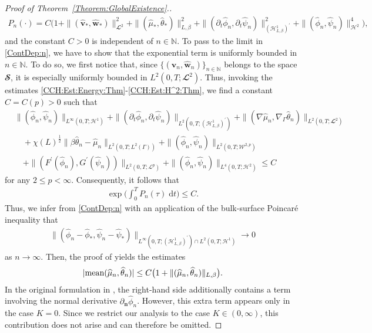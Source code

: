 \documentclass[10pt,reqno]{amsart}
\theoremstyle{remark}
\numberwithin{equation}{section}
\newcommand{\abs}[1]{| #1 |}
\newcommand{\norm}[1]{\| #1 \|}
\newcommand{\scp}[2]{ ( #1 , #2  )}
\newcommand{\mean}[2]{\textnormal{mean}\scp{#1}{#2}}
\newcommand{\N}{\mathbb N}
\newcommand{\n}{\mathbf{n}}
\newcommand{\bv}{\mathbf{v}}
\newcommand{\bw}{\mathbf{w}}
\newcommand{\ww}{\widehat{\bw}}
\newcommand{\wv}{\widehat{\bv}}
\newcommand{\wphi}{\widehat{\phi}}
\newcommand{\wpsi}{\widehat{\psi}}
\newcommand{\wmu}{\widehat{\mu}}
\newcommand{\wtheta}{\widehat{\theta}}
\newcommand{\dt}{\;\mathrm dt}
\newcommand{\delt}{\partial_{t}}
\newcommand{\deln}{\partial_\n}
\newcommand{\Grad}{\nabla}
\newcommand{\Gradg}{\nabla_\Ga}
\newcommand{\Ga}{\Gamma}
\begin{document}
\begin{proof}[Proof of Theorem~\ref{Theorem:GlobalExistence}.]
\begin{align*}
    P_n(\cdot) = C\big(1 + \norm{(\wv_\ast,\ww_\ast)}_{\mathbfcal{L}^2}^2 + \norm{(\wmu_\ast,\wtheta_\ast)}_{L,\beta}^2 + \norm{(\delt\wphi_n,\delt\wpsi_n)}_{(\mathcal{H}^1_{L,\beta})^\prime}^2 + \norm{(\wphi_n,\wpsi_n)}_{\mathcal{H}^2}^4\big),
\end{align*}
and the constant $C > 0$ is independent of $n\in\N$. To pass to the limit in \eqref{ContDep:n}, we have to show that the exponential term is uniformly bounded in $n\in\N$. To do so, we first notice that, since $\{(\wv_n,\ww_n)\}_{n\in\N}$ belongs to the space $\mathbfcal{S}$, it is especially uniformly bounded in $L^2(0,T;\mathbfcal{L}^2)$. Thus, invoking the estimates \eqref{CCH:Est:Energy:Thm}-\eqref{CCH:Est:H^2:Thm}, we find a constant $C = C(p) > 0$ such that
\begin{align}\label{Est:All:n}
    &\norm{(\wphi_n,\wpsi_n)}_{L^\infty(0,T;\mathcal{H}^1)} + \norm{(\delt\wphi_n,\delt\wpsi_n)}_{L^2(0,T;(\mathcal{H}^1_{L,\beta})^\prime)} + \norm{(\Grad\wmu_n,\Gradg\wtheta_n)}_{L^2(0,T;\mathbfcal{L}^2)} \nonumber \\
    &\quad + \chi(L)^{\frac12}\norm{\beta\wtheta_n - \wmu_n}_{L^2(0,T;L^2(\Ga))} + \norm{(\wphi_n,\wpsi_n)}_{L^2(0,T;\mathcal{W}^{2,p})} \\
    &\quad + \norm{(F^\prime(\wphi_n),G^\prime(\wpsi_n))}_{L^2(0,T;\mathcal{L}^p)} + \norm{(\wphi_n,\wpsi_n)}_{L^4(0,T;\mathcal{H}^2)} \leq C \nonumber
\end{align}
for any $2 \leq p < \infty$. Consequently, it follows that
\begin{align*}
    \exp\Big(\int_0^T P_n(\tau)\dt\Big) \leq C.
\end{align*}
Thus, we infer from \eqref{ContDep:n} with an application of the bulk-surface Poincar\'{e} inequality that
\begin{align}\label{ContDep:Conv}
    \norm{(\wphi_n - \wphi_\ast, \wpsi_n - \wpsi_\ast)}_{L^\infty(0,T;(\mathcal{H}^1_{L,\beta})^\prime)\cap L^2(0,T;\mathcal{H}^1)} \rightarrow 0 
\end{align}
as $n\rightarrow\infty$. 
Then, the proof of \cite[Theorem~3.4]{Knopf2025} yields the estimates
\begin{align}\label{Est:mt:mean:n}
    \abs{\mean{\wmu_n}{\wtheta_n}} \leq C\big(1 + \norm{(\wmu_n,\wtheta_n)}_{L,\beta}\big).
\end{align}
In the original formulation in \cite{Knopf2025}, the right-hand side additionally contains a term involving the normal derivative $\deln\wphi_n$. However, this extra term appears only in the case $K = 0$. Since we restrict our analysis to the case $K\in(0,\infty)$, this contribution does not arise and can therefore be omitted.

\end{proof}
\end{document}
